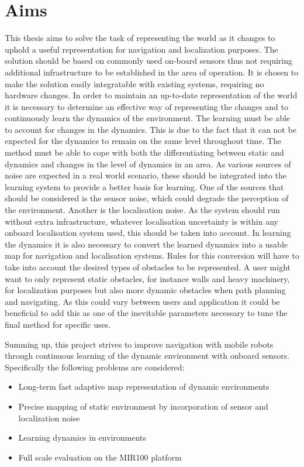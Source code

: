 \section{Aims}
This thesis aims to solve the task of representing the world as it changes to uphold a useful representation for navigation and localization purposes. 
The solution should be based on commonly used on-board sensors thus not requiring additional infrastructure to be established in the area of operation. 
It is chosen to make the solution easily integratable with existing systems, requiring no hardware changes. 
In order to maintain an up-to-date representation of the world it is necessary to determine an effective way of representing the changes and to continuously learn the dynamics of the environment. 
The learning must be able to account for changes in the dynamics. 
This is due to the fact that it can not be expected for the dynamics to remain on the same level throughout time. The method must be able to cope with both the differentiating between static and dynamics and changes in the level of dynamics in an area. 
As various sources of noise are expected in a real world scenario, these should be integrated into the learning system to provide a better basis for learning. One of the sources that should be considered is the sensor noise, which could degrade the perception of the environment. Another is the localisation noise.
As the system should run without extra infrastructure, whatever localisation uncertainty is within any onboard localisation system used, this should be taken into account.
In learning the dynamics it is also necessary to convert the learned dynamics into a usable map for navigation and localisation systems. Rules for this conversion will have to take into account the desired types of obstacles to be represented. 
A user might want to only represent static obstacles, for instance walls and heavy machinery, for localization purposes but also more dynamic obstacles when path planning and navigating. 
As this could vary between users and application it could be beneficial to add this as one of the inevitable parameters necessary to tune the final method for specific uses. 

Summing up, this project strives to improve navigation with mobile robots through continuous learning of the dynamic environment with onboard sensors. Specifically the following problems are considered:

\begin{itemize}
\item Long-term fast adaptive map representation of dynamic environments
\item Precise mapping of static environment by incorporation of sensor and localization noise
\item Learning dynamics in environments
\item Full scale evaluation on the MIR100 platform
\end{itemize}

